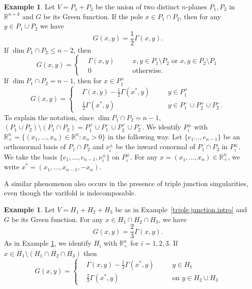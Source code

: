 \documentclass[11pt]{amsart}
\theoremstyle{definition}
\newtheorem{example}[theorem]{Example}
\newcommand{\R}{\mathbb{R}}
\begin{document}
\begin{example}\label{2planes}
	Let $V=P_1+P_2$ be the union of two distinct $n$-planes $P_1,P_2$ in $\R^{n+k}$ and $G$ be its Green function. If the pole $x\in P_1\cap P_2$, then for any $y\in P_1\cup P_2$ we have
	\[G(x,y)=\frac{1}{2}\Gamma(x,y).\]
	If $\dim P_1\cap P_2\le n-2$, then
	\[G(x,y)=\left\{\begin{aligned}
		&\Gamma(x,y)&\quad& x,y\in P_1\setminus P_2\text{ or }x,y\in P_2\setminus P_1\\
		&0 &\quad &\text{otherwise.}
	\end{aligned}\right.\] 
    If $\dim P_1\cap P_2=n-1$, then for $x\in P_1^+$
	\[G(x,y)=\left\{\begin{aligned}
		&\Gamma(x,y)-\frac{1}{2} \Gamma (x^*,y)&\quad& y\in P_1^+\\
		&\frac{1}{2}\Gamma(x^*,y)&\quad&y\in P_1^-\cup P_2^+\cup P_2^- .
	\end{aligned}\right.\]
	To explain the notation, since $\dim P_1\cap P_2=n-1$, $(P_1\cup P_2)\setminus(P_1\cap P_2)=P_{1}^+\cup P_1^-\cup P_2^+\cup P_2^-$. We identify $P_i^\pm$ with $\R^n_+=\{(x_1,\dots,x_n)\in \R^n:x_n>0\}$ in the following way. Let $\{e_1\dots,e_{n-1}\}$ be an orthonormal basis of $P_1\cap P_2$ and $\nu_i^\pm$ be the inward conormal of $P_1\cap P_2$ in $P_i^\pm$. We take the basis $\{e_1,\dots,e_{n-1},\nu_i^\pm\}$ on $P_i^\pm$. For any $x=(x_1,\dots,x_n)\in \R^n_+$, we write $x^*=(x_1,\dots,x_{n-1},-x_n)$.
\end{example}
A similar phenomenon also occurs in the presence of triple junction singularities, even though the varifold is indecomposable.
\begin{example}
    Let $V=H_1+H_2+H_3$ be as in Example~\ref{triple.junction.intro} and $G$ be its Green function. 
    For any $x\in H_1\cap H_2\cap H_3$, we have
	\[G(x,y)=\frac{2}{3}\Gamma(x,y).\]
	As in Example \ref{2planes}, we identify $H_i$ with $ \R^n_+$ for $i=1,2,3$.
	If $x\in H_1\setminus (H_1\cap H_2\cap H_3)$ then
	\[G(x,y)=\left\{\begin{aligned}
		&\Gamma(x,y)-\frac{1}{3} \Gamma (x^*,y)&\quad& y\in H_1\\
		&\frac{2}{3}\Gamma(x^*,y)&\quad&\text{on }  y\in H_2\cup  H_3 
	\end{aligned}\right.\]
\end{example}
\end{document}
